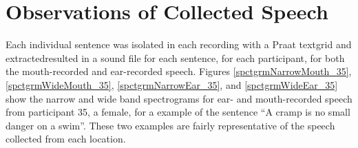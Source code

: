 \DIFdelbegin %
\DIFdelend \DIFaddbegin \section{Observations of Collected Speech}\label{chap2:observations}
\DIFaddend 

Each individual sentence was isolated in each recording with a Praat textgrid and extracted\DIFdelbegin {}\DIFdelend \DIFaddbegin {}\DIFaddend resulted in a sound file for each sentence, for each participant, for both the mouth-recorded and ear-recorded speech.  Figures \ref{spctgrmNarrowMouth_35}, \ref{spctgrmWideMouth_35}, \ref{spctgrmNarrowEar_35}, and \ref{spctgrmWideEar_35} show the narrow and wide band spectrograms for ear- and mouth-recorded speech from participant 35, a female, for a \DIFdelbegin {}\DIFdelend \DIFaddbegin {}\DIFaddend example of the sentence ``A cramp is no small danger on a swim''.  These two examples are fairly representative of the speech collected from each location.

